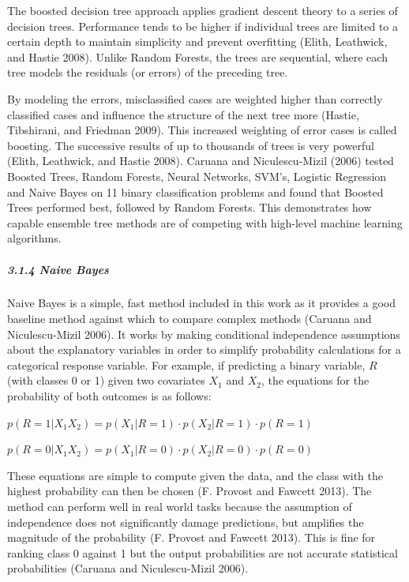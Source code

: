 \documentclass[]{elsarticle} %
\begin{document}
The boosted decision tree approach applies gradient descent theory to a
series of decision trees. Performance tends to be higher if individual
trees are limited to a certain depth to maintain simplicity and prevent
overfitting (Elith, Leathwick, and Hastie 2008). Unlike Random Forests,
the trees are sequential, where each tree models the residuals (or
errors) of the preceding tree.

By modeling the errors, misclassified cases are weighted higher than
correctly classified cases and influence the structure of the next tree
more (Hastie, Tibshirani, and Friedman 2009). This increased weighting
of error cases is called boosting. The successive results of up to
thousands of trees is very powerful (Elith, Leathwick, and Hastie 2008).
Caruana and Niculescu-Mizil (2006) tested Boosted Trees, Random Forests,
Neural Networks, SVM's, Logistic Regression and Naive Bayes on 11 binary
classification problems and found that Boosted Trees performed best,
followed by Random Forests. This demonstrates how capable ensemble tree
methods are of competing with high-level machine learning algorithms.

\subparagraph{3.1.4 Naive Bayes}\label{naive-bayes}

Naive Bayes is a simple, fast method included in this work as it
provides a good baseline method against which to compare complex methods
(Caruana and Niculescu-Mizil 2006). It works by making conditional
independence assumptions about the explanatory variables in order to
simplify probability calculations for a categorical response variable.
For example, if predicting a binary variable, \(R\) (with classes 0 or
1) given two covariates \(X_1\) and \(X_2\), the equations for the
probability of both outcomes is as follows:

\(p(R = 1|X_1 X_2) = p(X_1|R = 1) \cdot p(X_2|R = 1) \cdot p(R = 1)\)

\(p(R = 0|X_1 X_2) = p(X_1|R = 0) \cdot p(X_2|R = 0) \cdot p(R = 0)\)

These equations are simple to compute given the data, and the class with
the highest probability can then be chosen (F. Provost and Fawcett
2013). The method can perform well in real world tasks because the
assumption of independence does not significantly damage predictions,
but amplifies the magnitude of the probability (F. Provost and Fawcett
2013). This is fine for ranking class 0 against 1 but the output
probabilities are not accurate statistical probabilities (Caruana and
Niculescu-Mizil 2006).
\end{document}
